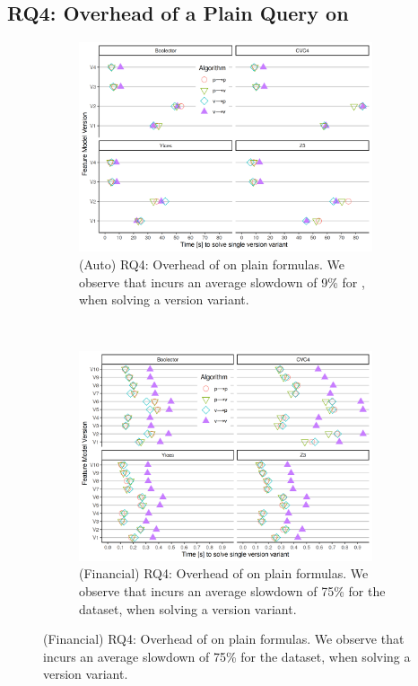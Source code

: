 \subsection{RQ4: Overhead of a Plain Query on \vsat{}}
%
\begin{figure}
  \begin{subfigure}[t]{\textwidth}
    \centering
    \includegraphics[width=0.95\textwidth]{Plots/RQ4_Auto}
    \caption{(Auto) RQ4: Overhead of \vTov{} on plain formulas. We observe that
      \vTov{} incurs an average slowdown of 9\% for \auto{}, when
      solving a version variant.}%
    \label{res:overhead:auto}
  \end{subfigure}
~
  \begin{subfigure}[t]{\textwidth}
    \centering
    \includegraphics[width=0.95\textwidth]{Plots/RQ4_Fin}
    \caption{(Financial) RQ4: Overhead of \vTov{} on plain formulas. We observe
      that \vTov{} incurs an average slowdown of 75\% for the \fin{}
      dataset, when solving a version variant.}%
    \label{res:overhead:fin}
  \end{subfigure}
\end{figure}
